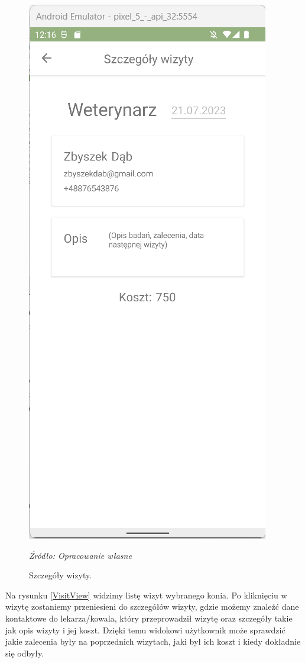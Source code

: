 \documentclass[12pt,twoside]{report}
\begin{document}
\begin{figure}[H]
\begin{center}
\begin{minipage}{5cm}
		\includegraphics[scale=0.6]{VisitViewDetails}
		\caption{\centering Szczegóły wizyty.}
		\textit{Źródło: Opracowanie własne}
		\label{VisitDetailsView}
	\end{minipage}
\end{center}
\end{figure}
Na rysunku \ref{VisitView} widzimy listę wizyt wybranego konia. Po kliknięciu w wizytę zostaniemy przeniesieni do szczegółów wizyty, gdzie możemy znaleźć dane kontaktowe do lekarza/kowala, który przeprowadził wizytę oraz szczegóły takie jak opis wizyty i jej koszt. Dzięki temu widokowi użytkownik może sprawdzić jakie zalecenia były na poprzednich wizytach, jaki był ich koszt i kiedy dokładnie się odbyły.
\end{document}
